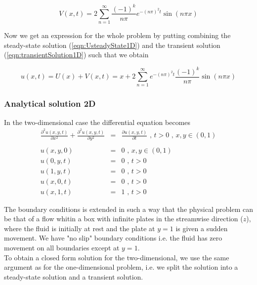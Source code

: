 \documentclass{article}
\begin{document}
\begin{equation}
V(x,t) = 2\sum_{n=1}^{\infty} \frac{(-1)^k}{n\pi} e^{-(n\pi)^2 t}\sin(n\pi x)
\label{eqn:transientSolution1D}
\end{equation}

Now we get an expression for the whole problem by putting combining the steady-state solution (\ref{eqn:UsteadyState1D}) and the transient solution (\ref{eqn:transientSolution1D}) such that we obtain 

\begin{equation}
u(x,t) = U(x) + V(x,t) = x + 2\sum_{n=1}^{\infty}e^{-(n\pi)^2 t} \frac{(-1)^k}{n\pi}
\sin(n\pi x)
\label{eqn:solution1D}
\end{equation}

\subsubsection{Analytical solution 2D}
In the two-dimensional case the differential equation becomes
\begin{subequations}
	\begin{eqnarray}
	\frac{\partial^2 u(x,y,t)}{\partial x^2} + \frac{\partial^2 u(x,y,t)}{\partial y^2} &=&  \frac{\partial u(x,y,t)}{\partial t} \textit{ , } t>0 \textit{ , } x,y \in (0,1) \\ \nonumber \\
	u(x,y,0) &=& 0 \textit{ , } x,y \in (0,1) \\ 
	u(0,y,t) &=& 0 \textit{ , } t> 0 \\
	u(1,y,t) &=& 0 \textit{ , } t> 0 \\
	u(x,0,t) &=& 0 \textit{ , } t> 0  \\
	u(x,1,t) &=& 1 \textit{ , } t> 0 
	\end{eqnarray}
\end{subequations}

The boundary conditions is extended in such a way that the physical problem can be that of a flow whitin a box with infinite plates in the streamwise direction ($z$), where the fluid is initially at rest and the plate at $y=1$ is given a sudden movement. We have "no slip" boundary conditions i.e. the fluid has zero movement on all boundaries except at $y=1$.\\

To obtain a closed form solution for the two-dimensional, we use the same argument as for the one-dimensional problem, i.e. we split the solution into a steady-state solution and a transient solution.\\
\end{document}

